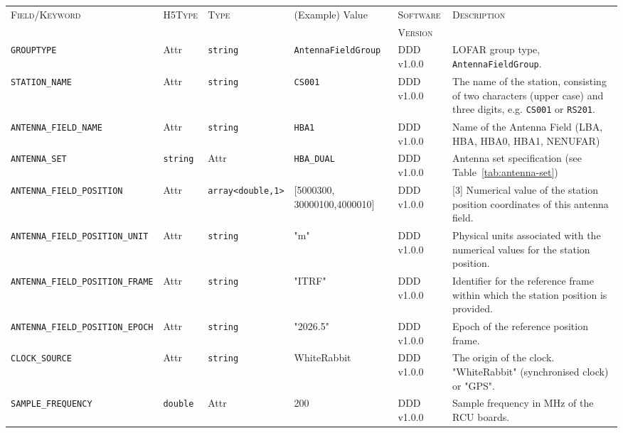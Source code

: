 \documentclass[a4paper,10pt,bibtotoc]{scrartcl}
\begin{document}
\newpage
\begin{landscape}
\begin{table}[htbp]
  \centering
  \begin{tabular}{|lllllp{5.5cm}|}
    \hline
    \textsc{Field/Keyword} & \textsc{H5Type} & \textsc{Type} & (Example) Value & \textsc{Software} & \textsc{Description} \\
                           &                 &               &                 & \textsc{Version}  &                      \\
    \hline
    \hline
    \small {\texttt{GROUPTYPE}} & Attr & \verb|string| & \texttt{AntennaFieldGroup} & DDD v1.0.0 & LOFAR group type, \texttt{AntennaFieldGroup}. \\
    \small {\texttt{STATION\_NAME}} & Attr & \verb|string| & \texttt{CS001} & DDD v1.0.0 & The name of the station, consisting of two characters (upper case) and three digits, e.g. \texttt{CS001} or \texttt{RS201}. \\
    \small {\texttt{ANTENNA\_FIELD\_NAME}} & Attr & \small\verb|string| & \texttt{HBA1}   & DDD v1.0.0 & Name of the Antenna Field (LBA, HBA, HBA0, HBA1, NENUFAR) \\
    \small {\texttt{ANTENNA\_SET}} & \small\verb|string| & Attr & \texttt{HBA\_DUAL} & DDD v1.0.0 & Antenna set specification (see Table~\ref{tab:antenna-set}) \\
    \small {\texttt{ANTENNA\_FIELD\_POSITION}} & Attr & \verb|array<double,1>| & [5000300, 30000100,4000010] & DDD v1.0.0 & [3] Numerical value of the station position coordinates of this antenna field. \\
    \small {\texttt{ANTENNA\_FIELD\_POSITION\_UNIT}}  & Attr & \verb|string| & "m" & DDD v1.0.0 & Physical units associated with the numerical values for the station position. \\
    \small {\texttt{ANTENNA\_FIELD\_POSITION\_FRAME}} & Attr & \verb|string| & "ITRF" & DDD v1.0.0 & Identifier for the reference frame within which the station position is provided. \\
    \small {\texttt{ANTENNA\_FIELD\_POSITION\_EPOCH}} & Attr & \verb|string| & "2026.5" & DDD v1.0.0 & Epoch of the reference position frame. \\
    \small {\texttt{CLOCK\_SOURCE}} & Attr & \verb|string| & WhiteRabbit &  DDD v1.0.0& The origin of the clock.  "WhiteRabbit" (synchronised clock) or "GPS". \\
    \small {\texttt{SAMPLE\_FREQUENCY}} & \verb|double| & Attr & 200 & DDD v1.0.0 & Sample frequency in MHz of the RCU boards. \\

\end{tabular}
\end{table}
\end{landscape}
\end{document}
